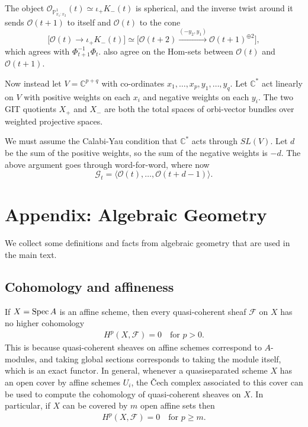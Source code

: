 \documentclass[12pt]{article}
\begin{document}
The object $\mathcal{O}_{\mathbb{P}^1_{x_1:x_2}}(t) \simeq \iota_+K_{-}(t)$ is spherical, and
the inverse twist around it sends $\mathcal{O}(t+1)$ to itself and $\mathcal{O}(t)$ to the cone
\[
  \big[\mathcal{O}(t) \longrightarrow \iota_+K_{-}(t)\big]
  \simeq \big[\mathcal{O}(t+2) \xrightarrow{(-y_2,y_1)} \mathcal{O}(t+1)^{\oplus 2}\big],
\]
which agrees with $\Phi_{t+1}^{-1}\Phi_t$. also agree on the Hom-sets between $\mathcal{O}(t)$ and
$\mathcal{O}(t+1)$.

Now instead let $V = \mathbb{C}^{p+q}$ with co-ordinates $x_1,\ldots,x_p, y_1,\ldots,y_q$.
Let $\mathbb{C}^*$ act linearly on $V$ with positive weights on each $x_i$ and negative weights
on each $y_i$. The two GIT quotients $X_+$ and $X_-$ are both the total spaces of orbi-vector
bundles over weighted projective spaces.

We must assume the Calabi-Yau condition that $\mathbb{C}^*$ acts through $SL(V)$. Let $d$ be the
sum of the positive weights, so the sum of the negative weights is $-d$. The above argument goes
through word-for-word, where now
\[
  \mathcal{G}_t = \langle \mathcal{O}(t), \ldots, \mathcal{O}(t+d-1)\rangle.
\]

\section{Appendix: Algebraic Geometry}
We collect some definitions and facts from algebraic geometry that are used in the main text.
\subsection{Cohomology and affineness}
If $X = \operatorname{Spec} A$ is an affine scheme, then every quasi-coherent sheaf $\mathcal{F}$ on $X$ has no higher cohomology
\begin{align*}
H^p(X,\mathcal{F}) = 0 \quad \text{for } p > 0.
\end{align*} This is because quasi-coherent sheaves on affine schemes correspond to $A$-modules, and taking global sections corresponds to taking the module itself, which is an exact functor. In general, whenever a quasiseparated scheme $X$ has an open cover by affine schemes $U_i$, the \v{C}ech complex associated to this cover can be used to compute the cohomology of quasi-coherent sheaves on $X$. In particular, if $X$ can be covered by $m$ open affine sets then \begin{align*}
H^p(X,\mathcal{F}) = 0 \quad \text{for } p \geq m.
\end{align*}
\end{document}
